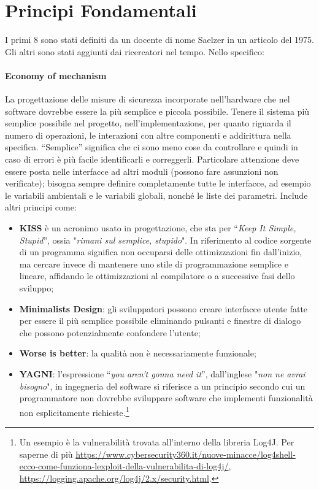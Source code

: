 \section{Principi Fondamentali}

I primi 8 sono stati definiti da un docente di nome
Saelzer in un articolo del 1975. Gli altri sono stati
aggiunti dai ricercatori nel tempo. Nello specifico:

\paragraph{Economy of mechanism}
La progettazione delle misure di sicurezza incorporate
nell'hardware che nel software dovrebbe essere la più semplice e piccola possibile.
Tenere il sistema più semplice possibile nel progetto, nell'implementazione,
per quanto riguarda il
numero di operazioni, le interazioni con altre componenti e addirittura nella
specifica. “Semplice”
significa che ci sono meno cose da controllare e quindi in caso di errori è più
facile identificarli e
correggerli.
Particolare attenzione deve essere posta nelle interfacce ad altri moduli
(possono fare assunzioni
non verificate); bisogna sempre definire completamente tutte le interfacce,
ad esempio le variabili
ambientali e le variabili globali, nonché le liste dei parametri.
Include altri principi come:

\begin{itemize}
    \item \textbf{KISS} è un acronimo usato in progettazione, che sta per
          “\textit{Keep It Simple, Stupid}”, ossia
          "\textit{rimani sul semplice, stupido}".
          In riferimento al codice sorgente di un programma significa
          non occuparsi delle ottimizzazioni fin dall'inizio, ma cercare invece
          di mantenere uno stile di
          programmazione semplice e lineare, affidando le ottimizzazioni al
          compilatore o a
          successive fasi dello sviluppo;
    \item \textbf{Minimalists Design}: gli sviluppatori possono creare interfacce
          utente fatte per essere il più
          semplice possibile eliminando pulsanti e finestre di dialogo che
          possono potenzialmente
          confondere l'utente;
    \item \textbf{Worse is better}: la qualità non è necessariamente funzionale;
    \item \textbf{YAGNI}: l'espressione “\textit{you aren't gonna need it}”,
          dall'inglese "\textit{non ne avrai bisogno}",
          in ingegneria del software si riferisce a un principio secondo cui un
          programmatore non dovrebbe sviluppare software che implementi funzionalità non
          esplicitamente richieste.\footnote{Un esempio è la vulnerabilità
              trovata all'interno della libreria Log4J. Per saperne di più
              \url{https://www.cybersecurity360.it/nuove-minacce/log4shell-ecco-come-funziona-lexploit-della-vulnerabilita-di-log4j/},
              \url{https://logging.apache.org/log4j/2.x/security.html}.}
\end{itemize}

